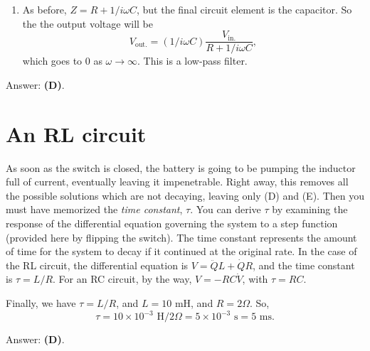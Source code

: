 \documentclass[11pt]{paper}
\newcommand{\answer}[1]{Answer: \textbf{(#1)}.}
\begin{document}
\begin{enumerate}[label=\Roman*.]
\item As before, $Z = R + 1/i\omega C$, but the final circuit element is the capacitor.  So the the output voltage will be
\begin{equation}
V_\text{out.} = \left(1/i\omega C\right)\frac{V_\text{in.}}{R+1/i\omega C},
\end{equation}
which goes to $0$ as $\omega \rightarrow \infty$.  This is a low-pass filter.
\end{enumerate}

\answer{D}

\section{An RL circuit}
As soon as the switch is closed, the battery is going to be pumping the inductor full of current, eventually leaving it impenetrable.  Right away, this removes all the possible solutions which are not decaying, leaving only (D) and (E).  Then you must have memorized the \emph{time constant}, $\tau$.  You can derive $\tau$ by examining the response of the differential equation governing the system to a step function (provided here by flipping the switch).  The time constant represents the amount of time for the system to decay if it continued at the original rate.  In the case of the RL circuit, the differential equation is $V = \ddot{Q}L + \dot{Q}R$, and the time constant is $\tau = L/R$.  For an RC circuit, by the way, $V = -RC\dot{V}$, with $\tau = RC$.

Finally, we have $\tau = L/R$, and $L = 10 \text{ mH}$, and $R = 2 \Omega$.  So,
\begin{equation}
\tau = 10\times10^{-3}\text{ H}/2\Omega = 5\times10^{-3}\text{ s} = 5\text{ ms}.
\end{equation}

\answer{D}
\end{document}
